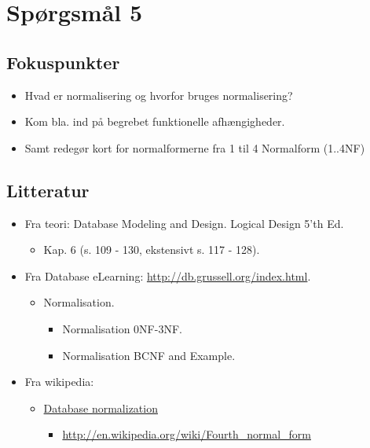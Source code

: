 \section{Spørgsmål 5}

\subsection{Fokuspunkter}

\begin{itemize}
	\item Hvad er normalisering og hvorfor bruges normalisering?
	\item Kom bla. ind på begrebet funktionelle afhængigheder.
	\item Samt redegør kort for normalformerne fra 1 til 4 Normalform (1..4NF)
\end{itemize}

\subsection{Litteratur}
\begin{itemize}
	
	\item Fra teori: Database Modeling and Design. Logical Design 5'th Ed.
	\begin{itemize}
		\item Kap. 6 (s. 109 - 130, ekstensivt s. 117 - 128).
	\end{itemize}
	
	\item Fra Database eLearning: \url{http://db.grussell.org/index.html}.
	\begin{itemize}
		\item Normalisation.
		\begin{itemize}
			\item Normalisation 0NF-3NF.
			\item Normalisation BCNF and Example.
		\end{itemize}
	\end{itemize}
	
	\item Fra wikipedia:
	\begin{itemize}
		\item \href{https://en.wikipedia.org/wiki/Database_normalization}{Database normalization}
		\begin{itemize}
			\item \url{http://en.wikipedia.org/wiki/Fourth_normal_form}
		\end{itemize}
	\end{itemize}
%	
\end{itemize}

